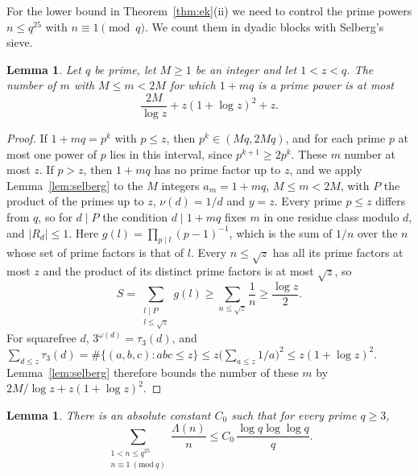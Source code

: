 \documentclass[screen,reqno]{aomart}
\numberwithin{equation}{section}
\newtheorem{lemma}[theorem]{Lemma}
\theoremstyle{definition}
\begin{document}
For the lower bound in Theorem~\ref{thm:ek}(ii) we need to control the prime powers $n\le q^{25}$
with $n\equiv1\pmod q$. We count them in dyadic blocks with Selberg's sieve.

\begin{lemma}\label{lem:block}
Let $q$ be prime, let $M\ge1$ be an integer and let $1<z<q$. The number of $m$ with
$M\le m<2M$ for which $1+mq$ is a prime power is at most
\[
  \frac{2M}{\log z}+z(1+\log z)^2+z.
\]
\end{lemma}

\begin{proof}
If $1+mq=p^k$ with $p\le z$, then $p^k\in(Mq,2Mq)$, and for each prime $p$ at most one power of
$p$ lies in this interval, since $p^{k+1}\ge2p^k$. These $m$ number at most $z$. If $p>z$, then
$1+mq$ has no prime factor up to $z$, and we apply Lemma~\ref{lem:selberg} to the $M$ integers
$a_m=1+mq$, $M\le m<2M$, with $P$ the product of the primes up to $z$, $\nu(d)=1/d$ and $y=z$.
Every prime $p\le z$ differs from $q$, so for $d\mid P$ the condition $d\mid1+mq$ fixes $m$ in one
residue class modulo $d$, and $|R_d|\le1$. Here $g(l)=\prod_{p\mid l}(p-1)^{-1}$, which is the sum
of $1/n$ over the $n$ whose set of prime factors is that of $l$. Every $n\le\sqrt z$ has all its
prime factors at most $z$ and the product of its distinct prime factors is at most $\sqrt z$, so
\[
  S=\sum_{\substack{l\mid P\\l\le\sqrt z}}g(l)\ge\sum_{n\le\sqrt z}\frac1n\ge\frac{\log z}2.
\]
For squarefree $d$, $3^{\omega(d)}=\tau_3(d)$, and
$\sum_{d\le z}\tau_3(d)=\#\{(a,b,c):abc\le z\}\le z\bigl(\sum_{a\le z}1/a\bigr)^2\le z(1+\log z)^2$.
Lemma~\ref{lem:selberg} therefore bounds the number of these $m$ by $2M/\log z+z(1+\log z)^2$.
\end{proof}

\begin{lemma}\label{lem:progression}
There is an absolute constant $C_0$ such that for every prime $q\ge3$,
\[
  \sum_{\substack{1<n\le q^{25}\\n\equiv1\ (\mathrm{mod}\ q)}}\frac{\Lambda(n)}n
  \le C_0\,\frac{\log q\log\log q}q.
\]
\end{lemma}
\end{document}
